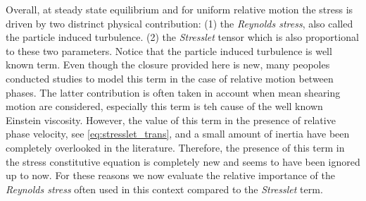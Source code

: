 Overall, at steady state equilibrium and for uniform relative motion the stress is driven by two distrinct physical contribution: 
(1) the \textit{Reynolds stress}, also called the particle induced turbulence. 
(2) the \textit{Stresslet} tensor which is also proportional to these two parameters. 
Notice that the particle induced turbulence is well known term. 
Even though the closure provided here is new, many peopoles conducted studies to model this term in the case of relative motion between phases. 
The latter contribution is often taken in account when mean shearing motion are considered, especially this term is teh cause of the well known Einstein viscosity. 
However, the value of this term in the presence of relative phase velocity, see \ref{eq:stresslet_trans},  and a small amount of inertia have been completely overlooked in the literature. 
Therefore, the presence of this term in the stress constitutive equation is completely new and seems to have been ignored up to now. 
For these reasons we now evaluate the relative importance of the \textit{Reynolds stress} often used in this context compared to the \textit{Stresslet} term. 

